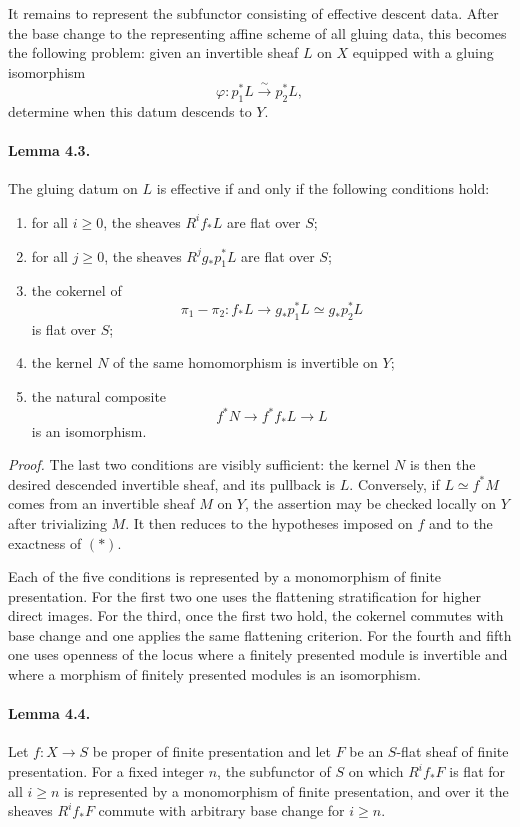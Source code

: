 \documentclass[11pt]{article}
\theoremstyle{plain}
\theoremstyle{definition}
\theoremstyle{remark}
\providecommand{\iso}{\xrightarrow{\sim}}
\begin{document}
It remains to represent the subfunctor consisting of effective descent data. After the base change to the representing affine scheme of all gluing data, this becomes the following problem: given an invertible sheaf $L$ on $X$ equipped with a gluing isomorphism
\[
\varphi:p_1^*L\iso p_2^*L,
\]
determine when this datum descends to $Y$.

\paragraph{Lemma 4.3.}
The gluing datum on $L$ is effective if and only if the following conditions hold:
\begin{enumerate}[label=\arabic*)]
\item for all $i\geq0$, the sheaves $R^if_*L$ are flat over $S$;
\item for all $j\geq0$, the sheaves $R^jg_*p_1^*L$ are flat over $S$;
\item the cokernel of
\[
\pi_1-\pi_2:f_*L\to g_*p_1^*L\simeq g_*p_2^*L
\]
is flat over $S$;
\item the kernel $N$ of the same homomorphism is invertible on $Y$;
\item the natural composite
\[
f^*N\to f^*f_*L\to L
\]
is an isomorphism.
\end{enumerate}

\emph{Proof.}
The last two conditions are visibly sufficient: the kernel $N$ is then the desired descended invertible sheaf, and its pullback is $L$. Conversely, if $L\simeq f^*M$ comes from an invertible sheaf $M$ on $Y$, the assertion may be checked locally on $Y$ after trivializing $M$. It then reduces to the hypotheses imposed on $f$ and to the exactness of $(*)$.

Each of the five conditions is represented by a monomorphism of finite presentation. For the first two one uses the flattening stratification for higher direct images. For the third, once the first two hold, the cokernel commutes with base change and one applies the same flattening criterion. For the fourth and fifth one uses openness of the locus where a finitely presented module is invertible and where a morphism of finitely presented modules is an isomorphism.

\paragraph{Lemma 4.4.}
Let $f:X\to S$ be proper of finite presentation and let $F$ be an $S$-flat sheaf of finite presentation. For a fixed integer $n$, the subfunctor of $S$ on which $R^if_*F$ is flat for all $i\geq n$ is represented by a monomorphism of finite presentation, and over it the sheaves $R^if_*F$ commute with arbitrary base change for $i\geq n$.
\end{document}
